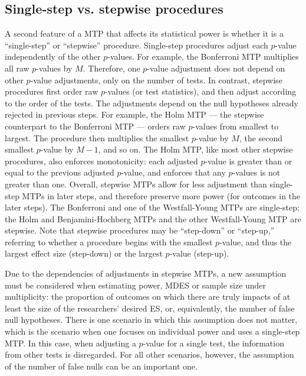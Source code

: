 \documentclass[
]{article}
\begin{document}
\subsection{Single-step vs. stepwise procedures}
\label{sec:stepwise}

A second feature of a MTP that affects its statistical power is whether
it is a ``single-step'' or ``stepwise'' procedure. Single-step
procedures adjust each \(p\)-value independently of the other
\(p\)-values. For example, the Bonferroni MTP multiplies all raw
\(p\)-values by \(M\). Therefore, one \(p\)-value adjustment does not
depend on other \(p\)-value adjustments, only on the number of tests. In
contrast, stepwise procedures first order raw \(p\)-values (or test
statistics), and then adjust according to the order of the tests. The
adjustments depend on the null hypotheses already rejected in previous
steps. For example, the Holm MTP --- the stepwise counterpart to the
Bonferroni MTP --- orders raw \(p\)-values from smallest to largest. The
procedure then multiplies the smallest \(p\)-value by \(M\), the second
smallest \(p\)-value by \(M-1\), and so on. The Holm MTP, like most
other stepwise procedures, also enforces monotonicity: each adjusted
\(p\)-value is greater than or equal to the previous adjusted
\(p\)-value, and enforces that any \(p\)-values is not greater than one.
Overall, stepwise MTPs allow for less adjustment than single-step MTPs
in later steps, and therefore preserve more power (for outcomes in the
later steps). The Bonferroni and one of the Westfall-Young MTPs are
single-step; the Holm and Benjamini-Hochberg MTPs and the other
Westfall-Young MTP are stepwise. Note that stepwise procedures may be
``step-down'' or ``step-up,'' referring to whether a procedure begins
with the smallest \(p\)-value, and thus the largest effect size
(step-down) or the largest \(p\)-value (step-up).

Due to the dependencies of adjustments in stepwise MTPs, a new
assumption must be considered when estimating power, MDES or sample size
under multiplicity: the proportion of outcomes on which there are truly
impacts of at least the size of the researchers' desired ES, or,
equivalently, the number of false null hypotheses. There is one scenario
in which this assumption does not matter, which is the scenario when one
focuses on individual power and uses a single-step MTP. In this case,
when adjusting a \(p\)-value for a single test, the information from
other tests is disregarded. For all other scenarios, however, the
assumption of the number of false nulls can be an important one.
\end{document}
